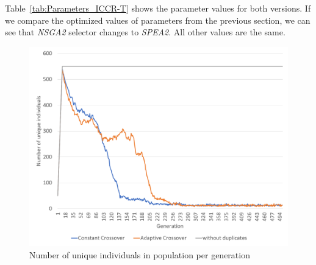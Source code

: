 Table~\ref{tab:Parameters_ICCR-T} shows the parameter values for both versions. If we compare the optimized values of parameters from the previous section, we can see that \textit{NSGA2} selector changes to \textit{SPEA2}. All other values are the same.

\begin{table}
	\centering
	\caption{Parameters of ICCR and ICCR-T versions of the genetic solver}\label{tab:Parameters_ICCR-T}
\end{table}


\begin{figure}
	\centering
	\includegraphics[width=\textwidth]{images/UniqIndividualsPerGeneration3.pdf}
	\caption[Number of unique individuals in population per generation]{Number of unique individuals in population per generation}
	\label{fig:UniqIndividualsPerGeneration3}
\end{figure} 


